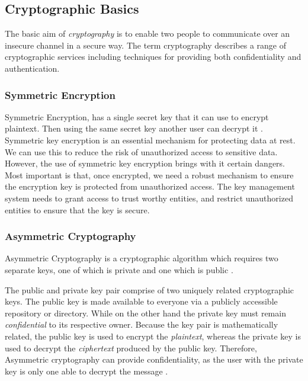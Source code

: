 		\subsection{Cryptographic Basics}
			The basic aim of \emph{cryptography} is to enable two people to communicate over an insecure channel in a secure way. The term cryptography describes a range of cryptographic services including techniques for providing both confidentiality and authentication.


			\subsubsection{Symmetric Encryption}
			
			Symmetric Encryption, has a single secret key that it can use to encrypt plaintext. Then using the same secret key another user can decrypt it \cite{ferguson2003practical}. Symmetric key encryption is an essential mechanism for protecting data at rest. We can use this to reduce the risk of unauthorized access to sensitive data. However, the use of symmetric key encryption brings with it certain dangers. Most important is that, once encrypted, we need a robust mechanism to ensure the encryption key is protected from unauthorized access. The key management system needs to grant access to trust worthy entities, and restrict unauthorized entities to ensure that the key is secure.

			\subsubsection{Asymmetric Cryptography}
			
			Asymmetric Cryptography is a cryptographic algorithm which requires two separate keys, one of which is private and one which is public \cite{ferguson2003practical}.

			The public and private key pair comprise of two uniquely related cryptographic keys. The public key is made available to everyone via a publicly accessible repository or directory. While on the other hand the private key must remain \emph{confidential} to its respective owner. Because the key pair is mathematically related, the public key is used to encrypt the \emph{plaintext}, whereas the private key is used to decrypt the \emph{ciphertext} produced by the public key. Therefore, Asymmetric cryptography can provide confidentiality, as the user with the private key is only one able to decrypt the message \cite{pub-key}.

